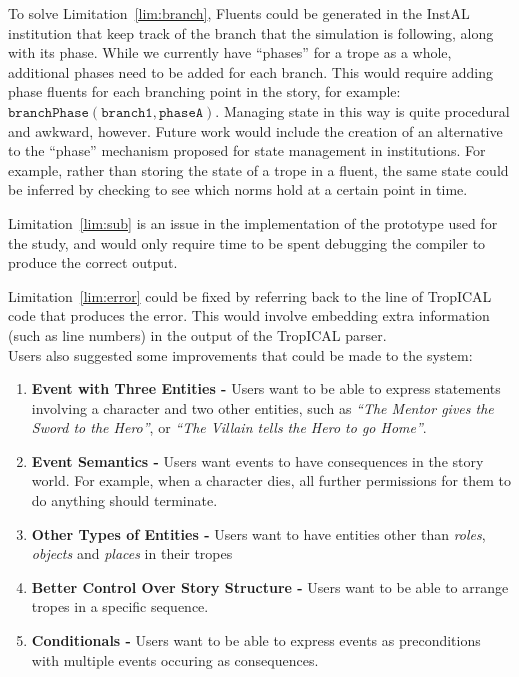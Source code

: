 \documentclass[11pt]{report}
\begin{document}
To solve Limitation~\ref{lim:branch}, Fluents could be
generated in the InstAL institution that keep track of the branch that the
simulation is following, along with its phase. While we currently have
``phases'' for a trope as a whole, additional phases need to be added for each
branch. This would require adding phase fluents for each branching point in the
story, for example: $\mathtt{branchPhase(branch1, phaseA)}$. Managing state
in this way is quite procedural and awkward, however. Future work would include
the creation of an alternative to
the ``phase'' mechanism proposed for state management in institutions. For
example, rather
than storing the state of a trope in a fluent, the same state could be inferred
by checking to see which norms hold at a certain point in time.

Limitation~\ref{lim:sub} is an issue in the implementation of the prototype
used for the study, and would only require time to be spent debugging the
compiler to produce the correct output.

Limitation~\ref{lim:error} could be fixed by referring back to the line of
TropICAL code that produces the error. This would involve embedding extra
information (such as line numbers) in the output of the TropICAL parser.\\

Users also suggested some improvements that could be made to the system:

\begin{enumerate}[{Improvement} 1:]
  \item\label{im:three} \textbf{Event with Three Entities -} Users want to be
    able to express statements involving a character and two other entities,
    such as \emph{``The Mentor gives the Sword to the Hero''}, or \emph{``The
      Villain tells the Hero to go Home''}.
  \item\label{im:sem} \textbf{Event Semantics -} Users want events to have
    consequences in the story world. For example, when a character dies, all
    further permissions for them to do anything should terminate.
  \item\label{im:ent} \textbf{Other Types of Entities -} Users want to have
    entities other than \emph{roles}, \emph{objects} and \emph{places} in their tropes
  \item\label{im:struc} \textbf{Better Control Over Story Structure -} Users want
    to be able to arrange tropes in a specific sequence.
  \item\label{im:cond} \textbf{Conditionals -} Users want to be able to express
    events as preconditions with multiple events occuring as consequences.
\end{enumerate}
\end{document}
